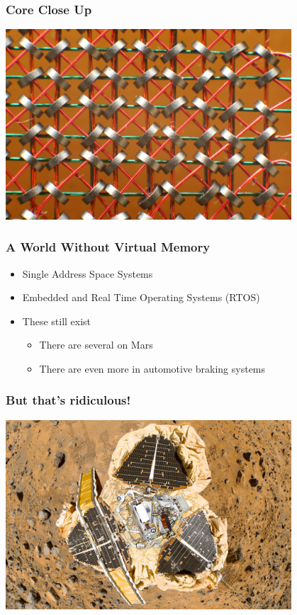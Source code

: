 \documentclass[pdftex]{beamer} %
\begin{document}
\begin{frame}
  \frametitle{Core Close Up}
  \begin{center}
    \includegraphics[width=0.8\textwidth]{../../figures/KL_Kernspeicher_Makro_1.jpg}
  \end{center}
\end{frame}

\begin{frame}
  \frametitle{A World Without Virtual Memory}
  \begin{itemize}
  \item Single Address Space Systems
  \item Embedded and Real Time Operating Systems (RTOS)
  \item These still exist
    \pause
    \begin{itemize}
    \item There are several on Mars
      \pause
    \item There are even more in automotive braking systems
    \end{itemize}
  \end{itemize}
\end{frame}

\begin{frame}
  \frametitle{But that's ridiculous!}
    \begin{center}
    \includegraphics[width=0.8\textwidth]{../../figures/pathfinder.jpg}
  \end{center}

\end{frame}
\end{document}
